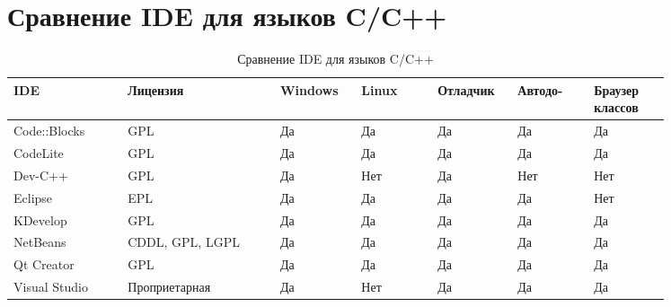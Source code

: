 \newpage
\section{Сравнение IDE для языков C/C++}
\begin{table}[h!]
    \caption{Сравнение IDE для языков C/C++}
    \centering
    \begin{tabular}[h!]{| p{0.15\linewidth} | p{0.2\linewidth} | p{0.1\linewidth} | p{0.1\linewidth} | p{0.1\linewidth} | p{0.1\linewidth} | p{0.1\linewidth} |}
        \hline
        \rowcolor{gray} IDE & Лицензия &Windows & Linux & Отладчик & Автодо- & Браузер классов\\\hline\hline
        Code::Blocks  & GPL & Да \cellcolor{Red}   & Да \cellcolor{Red}   & Да \cellcolor{Red}   & Да \cellcolor{Red}   & Да \cellcolor{Red}  \\\hline
        CodeLite  & GPL & Да \cellcolor{Red}   & Да \cellcolor{Red}   & Да \cellcolor{Red}   & Да \cellcolor{Red}   & Да \cellcolor{Red}  \\\hline
        Dev-C++  & GPL & Да \cellcolor{Red}   & Нет \cellcolor{green}   & Да \cellcolor{Red}   & Нет \cellcolor{green}   & Нет \cellcolor{green}  \\\hline
        Eclipse  &EPL & Да \cellcolor{Red}   & Да \cellcolor{Red}   & Да \cellcolor{Red}   & Да \cellcolor{Red}   & Нет \cellcolor{green}  \\\hline 
        KDevelop  & GPL & Да \cellcolor{Red}   & Да \cellcolor{Red}   & Да \cellcolor{Red}   & Да \cellcolor{Red}   & Да \cellcolor{Red}  \\\hline
        NetBeans  & CDDL, GPL, LGPL & Да \cellcolor{Red}   & Да \cellcolor{Red}   & Да \cellcolor{Red}   & Да \cellcolor{Red}   & Да \cellcolor{Red}  \\\hline
        Qt Creator  &GPL& Да \cellcolor{Red}   & Да \cellcolor{Red}   & Да \cellcolor{Red}   & Да \cellcolor{Red}   & Да \cellcolor{Red}  \\\hline
        Visual Studio  & Проприетарная & Да \cellcolor{Red}   & Нет \cellcolor{green}   & Да \cellcolor{Red}   & Да \cellcolor{Red}   & Да \cellcolor{Red} \\\hline
    \end{tabular}
\end{table}

